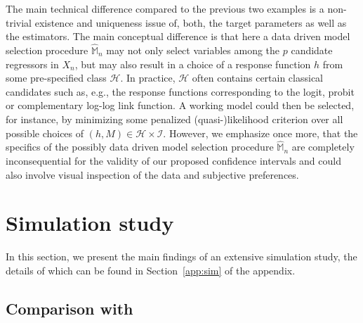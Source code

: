 \documentclass[preprint]{imsart}
\newcommand{\M}{\mathbb M}
\numberwithin{equation}{section}
\begin{document}
The main technical difference compared to the previous two examples is a non-trivial existence and uniqueness issue of, both, the target parameters as well as the estimators. The main conceptual difference is that here a data driven model selection procedure $\hat{\M}_n$ may not only select variables among the $p$ candidate regressors in $X_n$, but may also result in a choice of a response function $h$ from some pre-specified class $\mathcal H$. In practice, $\mathcal H$ often contains certain classical candidates such as, e.g., the response functions corresponding to the logit, probit or complementary log-log link function. A working model could then be selected, for instance, by minimizing some penalized (quasi-)likelihood criterion over all possible choices of $(h,M)\in\mathcal H\times \mathcal I$. However, we emphasize once more, that the specifics of the possibly data driven model selection procedure $\hat{\M}_n$ are completely inconsequential for the validity of our proposed confidence intervals and could also involve visual inspection of the data and subjective preferences. 




\section{Simulation study}\label{sec:sim}

In this section, we present the main findings of an extensive simulation study, the details of which can be found in Section~\ref{app:sim} of the appendix. 

\subsection{Comparison with \cite{Tib15a}}
\label{sec:sim:Tib}
\end{document}
